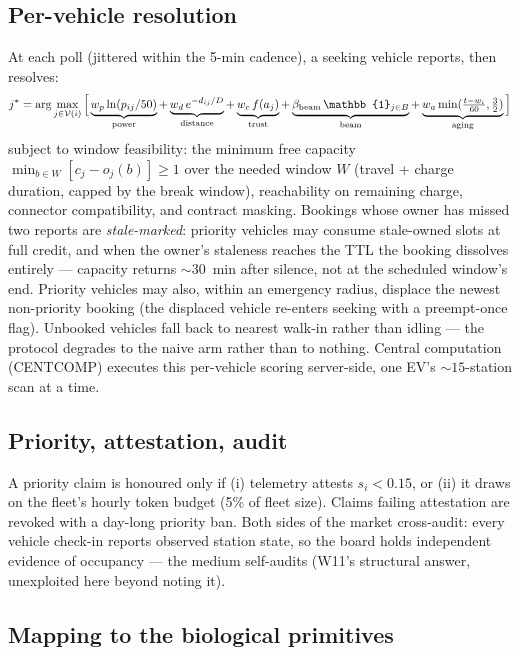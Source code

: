 \documentclass[twoside,twocolumn,usenatbib]{mnras}
\begin{document}
\subsection{Per-vehicle resolution}

At each poll (jittered within the 5-min cadence), a seeking vehicle
reports, then resolves:
\begin{equation}
\label{eq:score}
j^\ast = \arg\max_{j\in\mathcal{V}(i)} \Big[
\underbrace{w_p \ln (p_{ij}/50)}_{\text{power}}
+ \underbrace{w_d\, e^{-d_{ij}/D}}_{\text{distance}}
+ \underbrace{w_c\, f(a_j)}_{\text{trust}}
+ \underbrace{\beta_{\rm beam}\,\mathbb{1}_{j\in B}}_{\text{beam}}
+ \underbrace{w_a \min(\tfrac{t - w_i}{60}, \tfrac32)}_{\text{aging}}
\Big]
\end{equation}
subject to window feasibility: the minimum free capacity
$\min_{b\in W} [c_j - o_j(b)] \ge 1$ over the needed window $W$
(travel + charge duration, capped by the break window), reachability
on remaining charge, connector compatibility, and contract masking.
Bookings whose owner has missed two reports are \emph{stale-marked}:
priority vehicles may consume stale-owned slots at full credit, and
when the owner's staleness reaches the TTL the booking dissolves
entirely --- capacity returns $\sim$30~min after silence, not at the
scheduled window's end.  Priority vehicles may also, within an
emergency radius, displace the newest non-priority booking (the
displaced vehicle re-enters seeking with a preempt-once flag).  Unbooked vehicles fall back to nearest
walk-in rather than idling --- the protocol degrades to the naive
arm rather than to nothing.  Central computation (CENTCOMP) executes
this per-vehicle scoring server-side, one EV's $\sim\!15$-station
scan at a time.

\subsection{Priority, attestation, audit}

A priority claim is honoured only if (i) telemetry attests
$s_i<0.15$, or (ii) it draws on the fleet's hourly token budget
(5\% of fleet size).  Claims failing attestation are revoked with a
day-long priority ban.  Both sides of the market cross-audit: every
vehicle check-in reports observed station state, so the board holds
independent evidence of occupancy --- the medium self-audits
(W11's structural answer, unexploited here beyond noting it).

\subsection{Mapping to the biological primitives}
\end{document}
